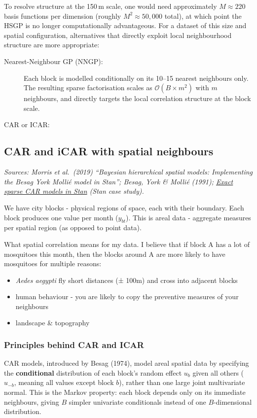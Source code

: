 \documentclass[12pt,a4paper]{article}
\begin{document}
To resolve structure at the 150\,m scale, one would need approximately $M \approx 220$ basis functions per dimension (roughly $M^2 \approx 50{,}000$ total), at which point the HSGP is no longer computationally advantageous. For a dataset of this size and spatial configuration, alternatives that directly exploit local neighbourhood structure are more appropriate:

\begin{description}
  \item[Nearest-Neighbour GP (NNGP):] Each block is modelled conditionally on its 10--15 nearest neighbours only. The resulting sparse factorisation scales as $\mathcal{O}(B \times m^2)$ with $m$ neighbours, and directly targets the local correlation structure at the block scale.
  \item[CAR or ICAR:] 
\end{description}

\subsection{CAR and iCAR with spatial neighbours}

\noindent\textit{Sources: Morris et al.\ (2019) ``Bayesian hierarchical spatial models: Implementing the Besag York Mollié model in Stan''; Besag, York \& Mollié (1991); \href{https://mc-stan.org/learn-stan/case-studies/icar_stan.html}{Exact sparse CAR models in Stan} (Stan case study).}

We have city blocks - physical regions of space, each with their boundary. Each block produces one value per month ($y_{bt}$). This is areal data - aggregate measures per spatial region (as opposed to point data).  

What spatial correlation means for my data. I believe that if block A has a lot of mosquitoes this month, then the blocks around A are more likely to have mosquitoes for multiple reasons: 
\begin{itemize}
  \item \textit{Aedes aegypti} fly short distances (± 100m) and cross into adjacent blocks
  \item human behaviour - you are likely to copy the preventive measures of your neighbours
  \item landscape \& topography 
\end{itemize}

\subsubsection{Principles behind CAR and ICAR}
CAR models, introduced by Besag (1974), model areal spatial data by specifying the \textbf{conditional} distribution of each block's random effect $u_b$ given all others ($u_{-b}$, meaning all values except block $b$), rather than one large joint multivariate normal. This is the Markov property: each block depends only on its immediate neighbours, giving $B$ simpler univariate conditionals instead of one $B$-dimensional distribution.
\end{document}
